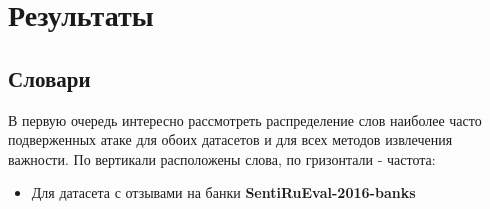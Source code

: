 \section{Результаты}
\label{sec:Results} 

\subsection{Словари}

\noindent\hspace{0.6cm}В первую очередь интересно рассмотреть распределение слов наиболее часто подверженных атаке для обоих датасетов и для всех методов извлечения важности. По вертикали расположены слова, по гризонтали - частота:

\begin{itemize}
    \item Для датасета с отзывами на банки \textbf{SentiRuEval-2016-banks}
\end{itemize}

